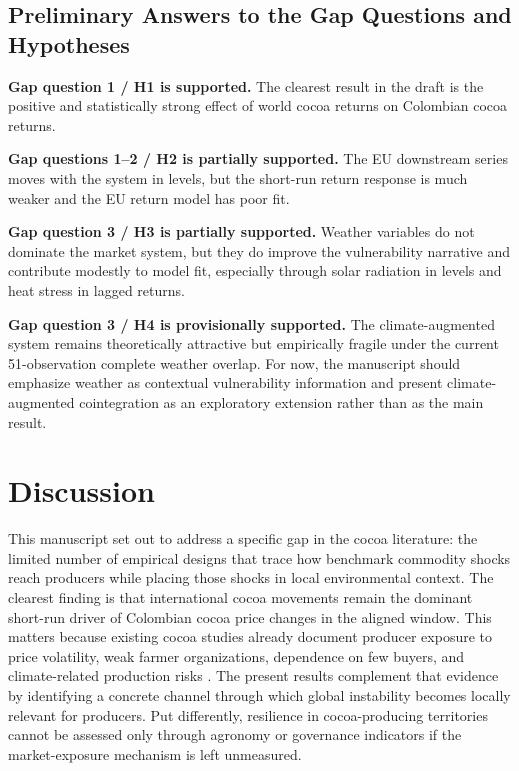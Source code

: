 \documentclass[11pt]{article}
\begin{document}
\subsection{Preliminary Answers to the Gap Questions and Hypotheses}

\textbf{Gap question 1 / H1 is supported.} The clearest result in the draft is the positive and statistically strong effect of world cocoa returns on Colombian cocoa returns.

\textbf{Gap questions 1--2 / H2 is partially supported.} The EU downstream series moves with the system in levels, but the short-run return response is much weaker and the EU return model has poor fit.

\textbf{Gap question 3 / H3 is partially supported.} Weather variables do not dominate the market system, but they do improve the vulnerability narrative and contribute modestly to model fit, especially through solar radiation in levels and heat stress in lagged returns.

\textbf{Gap question 3 / H4 is provisionally supported.} The climate-augmented system remains theoretically attractive but empirically fragile under the current 51-observation complete weather overlap. For now, the manuscript should emphasize weather as contextual vulnerability information and present climate-augmented cointegration as an exploratory extension rather than as the main result.

\section{Discussion}
\label{sec:discussion}

This manuscript set out to address a specific gap in the cocoa literature: the limited number of empirical designs that trace how benchmark commodity shocks reach producers while placing those shocks in local environmental context. The clearest finding is that international cocoa movements remain the dominant short-run driver of Colombian cocoa price changes in the aligned window. This matters because existing cocoa studies already document producer exposure to price volatility, weak farmer organizations, dependence on few buyers, and climate-related production risks \citep{Mithofer2017,AkrofiAtitianti2018}. The present results complement that evidence by identifying a concrete channel through which global instability becomes locally relevant for producers. Put differently, resilience in cocoa-producing territories cannot be assessed only through agronomy or governance indicators if the market-exposure mechanism is left unmeasured.
\end{document}
